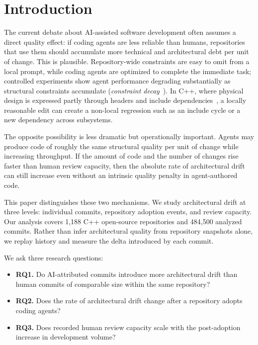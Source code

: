 \documentclass[sigplan,11pt,nonacm=true]{acmart}
\begin{document}

\maketitle

\section{Introduction}

The current debate about AI-assisted software development often assumes a
direct quality effect: if coding agents are less reliable than humans,
repositories that use them should accumulate more technical and architectural
debt per unit of change. This is plausible. Repository-wide constraints are
easy to omit from a local prompt, while coding agents are optimized to
complete the immediate task; controlled experiments show agent performance
degrading substantially as structural constraints accumulate
(\emph{constraint decay}~\cite{dente2026constraintdecay}). In C++, where
physical design is expressed partly through headers and include
dependencies~\cite{lakos1996}, a locally reasonable edit can create a
non-local regression such as an include cycle or a new dependency across
subsystems.

The opposite possibility is less dramatic but operationally important. Agents
may produce code of roughly the same structural quality per unit of change
while increasing throughput. If the amount of code and the number of changes
rise faster than human review capacity, then the absolute rate of
architectural drift can still increase even without an intrinsic quality
penalty in agent-authored code.

This paper distinguishes these two mechanisms. We study architectural drift at
three levels: individual commits, repository adoption events, and review
capacity. Our analysis covers 1{,}188 C++ open-source repositories and
484{,}500 analyzed commits. Rather than infer architectural quality from
repository snapshots alone, we replay history and measure the delta introduced
by each commit.

We ask three research questions:

\begin{itemize}
\item \textbf{RQ1.} Do AI-attributed commits introduce more architectural
  drift than human commits of comparable size within the same repository?
\item \textbf{RQ2.} Does the rate of architectural drift change after a
  repository adopts coding agents?
\item \textbf{RQ3.} Does recorded human review capacity scale with the
  post-adoption increase in development volume?
\end{itemize}
\end{document}

